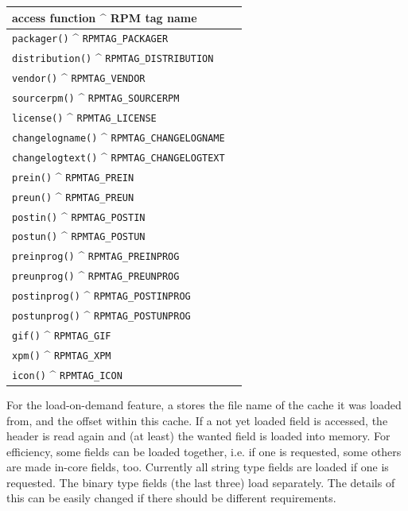 \documentclass[10pt]{article}
\begin{document}
\vspace{\baselineskip}
\begin{tabular}{|l|l|}\hline
access function ^ RPM tag name \\ \hline\hline
\texttt{packager()}			^ \texttt{RPMTAG_PACKAGER} \\
\texttt{distribution()}		^ \texttt{RPMTAG_DISTRIBUTION} \\
\texttt{vendor()}			^ \texttt{RPMTAG_VENDOR} \\
\texttt{sourcerpm()}		^ \texttt{RPMTAG_SOURCERPM} \\
\texttt{license()}			^ \texttt{RPMTAG_LICENSE} \\
\texttt{changelogname()}	^ \texttt{RPMTAG_CHANGELOGNAME} \\
\texttt{changelogtext()}	^ \texttt{RPMTAG_CHANGELOGTEXT} \\
\texttt{prein()}			^ \texttt{RPMTAG_PREIN} \\
\texttt{preun()}			^ \texttt{RPMTAG_PREUN} \\
\texttt{postin()}			^ \texttt{RPMTAG_POSTIN} \\
\texttt{postun()}			^ \texttt{RPMTAG_POSTUN} \\
\texttt{preinprog()}		^ \texttt{RPMTAG_PREINPROG} \\
\texttt{preunprog()}		^ \texttt{RPMTAG_PREUNPROG} \\
\texttt{postinprog()}		^ \texttt{RPMTAG_POSTINPROG} \\
\texttt{postunprog()}		^ \texttt{RPMTAG_POSTUNPROG} \\
\texttt{gif()}				^ \texttt{RPMTAG_GIF} \\
\texttt{xpm()}				^ \texttt{RPMTAG_XPM} \\
\texttt{icon()}				^ \texttt{RPMTAG_ICON} \\\hline
\end{tabular}
\vspace{\baselineskip}

For the load-on-demand feature, a  stores the file name
of the cache it was loaded from, and the offset within this cache. If
a not yet loaded field is accessed, the header is read again and (at
least) the wanted field is loaded into memory. For efficiency, some
fields can be loaded together, i.e. if one is requested, some others
are made in-core fields, too. Currently all string type fields are
loaded if one is requested. The binary type fields (the last three)
load separately. The details of this can be easily changed if
there should be different requirements.
\end{document}
